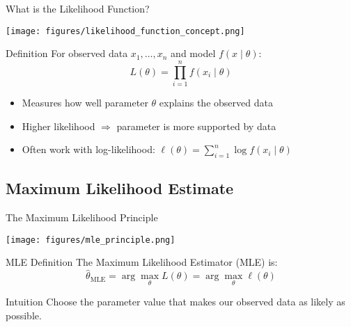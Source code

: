 \begin{frame}{What is the Likelihood Function?}
  \begin{center}
    \texttt{[image: figures/likelihood\_function\_concept.png]}
  \end{center}
  \vspace{-0.7em}
  \begin{block}{Definition}
    \footnotesize For observed data \(x_1, \ldots, x_n\) and model \(f(x \mid \theta)\):
    \[L(\theta) = \prod_{i=1}^n f(x_i \mid \theta)\]
  \end{block}
  \vspace{-0.2em}
  \begin{itemize}
    \footnotesize
    \item Measures how well parameter \(\theta\) explains the observed data
    \item Higher likelihood \(\Rightarrow\) parameter is more supported by data
    \item Often work with log-likelihood: \(\ell(\theta) = \sum_{i=1}^n \log f(x_i \mid \theta)\)
  \end{itemize}
\end{frame}

\subsection{Maximum Likelihood Estimate}

\begin{frame}{The Maximum Likelihood Principle}
  \begin{center}
    \texttt{[image: figures/mle\_principle.png]}
  \end{center}
  \vspace{-0.9em}
  \begin{block}{MLE Definition}
    \footnotesize The Maximum Likelihood Estimator (MLE) is:
    \[\hat{\theta}_{\text{MLE}} = \arg\max_{\theta} L(\theta) = \arg\max_{\theta} \ell(\theta)\]
  \end{block}
  \vspace{-0.3em}
  \begin{exampleblock}{Intuition}
    \footnotesize Choose the parameter value that makes our observed data as likely as possible.
  \end{exampleblock}
\end{frame}

